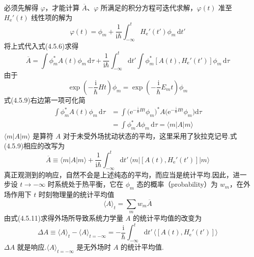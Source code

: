必须先解得 $\varphi$，才能计算 $\overline{A}$、$\varphi$ 所满足的积分方程可迭代求解，$\varphi(t)$ 准至 $H_{\mathrm{e}}'(t)$ 线性项的解为
\begin{equation}
  \varphi(t)=\phi_{m}+\frac{1}{\mathrm{i}\hbar}
  \int_{-\infty}^{t}H_{\mathrm{e}}'(t')\phi_{m}\,\mathrm{d}t'
\end{equation}
将上式代入式(4.5.6)求得
\begin{equation}
  \overline{A}=\int\phi_{m}^{*}A(t)\phi_{m}\,\mathrm{d}\tau
  +\frac{1}{\mathrm{i}\hbar}\int_{-\infty}^{t}\mathrm{d}t'
  \int\phi_{m}^{*}\left[A(t),H_{\mathrm{e}}'(t')\right]\phi_{m}\,\mathrm{d}\tau
\end{equation}
由于
\begin{equation*}
  \exp\left(-\frac{\mathrm{i}}{\hbar}Ht\right)\phi_{m}
  =\exp\left(-\frac{\mathrm{i}}{\hbar}E_{m}t\right)\phi_{m}
\end{equation*}
式(4.5.9)右边第一项可化简
\begin{equation}
\begin{aligned}
  \int\phi_{m}^{*}A(t)\phi_{m}\,\mathrm{d}\tau
  &=\int\big(\mathrm{e}^{-\frac{\mathrm{i}}{\hbar}Ht}\phi_{m}\big)^{*}
  A\big(\mathrm{e}^{-\frac{\mathrm{i}}{\hbar}Ht}\phi_{m}\big)\mathrm{d}\tau\\
  &=\int\phi_{m}^{*}A\phi_{m}\,\mathrm{d}\tau=\langle m|A|m\rangle
\end{aligned}
\end{equation}
$\langle m|A|m\rangle$ 是算符 $A$ 对于未受外场扰动状态的平均，这里采用了狄拉克记号.式(4.5.9)相应的改写为
\begin{equation}
  \overline{A}\equiv\langle m|A|m\rangle
  +\frac{1}{\mathrm{i}\hbar}\int_{-\infty}^{t}\mathrm{d}t'\,
  \langle m|\left[A(t),H_{\mathrm{e}}'(t')\right]|m\rangle
\end{equation}
真正观测到的响应，自然不会是上述纯态的平均，而应当是统计平均.因此，进一步设 $t\to-\infty$ 时系统处于热平衡，它在 $\phi_{m}$ 态的概率（probability）为 $w_{m}$，在外场作用下 $t$ 时刻物理量的统计平均值
\begin{equation}
  \langle A\rangle_{t}=\sum_{m}w_{m}\overline{A}
\end{equation}
由式(4.5.11)求得外场所导致系统力学量 $A$ 的统计平均值的改变为
\begin{equation}
  \Delta A\equiv\langle A\rangle_{t}-\langle A\rangle_{t=-\infty}
  =-\frac{\mathrm{i}}{\hbar}\int_{-\infty}^{t}\mathrm{d}t'\,
  \langle\left[A(t),H_{\mathrm{e}}'(t')\right]\rangle
\end{equation}
$\Delta A$ 就是响应.$\langle A\rangle_{t=-\infty}$ 是无外场时 $A$ 的统计平均值.

